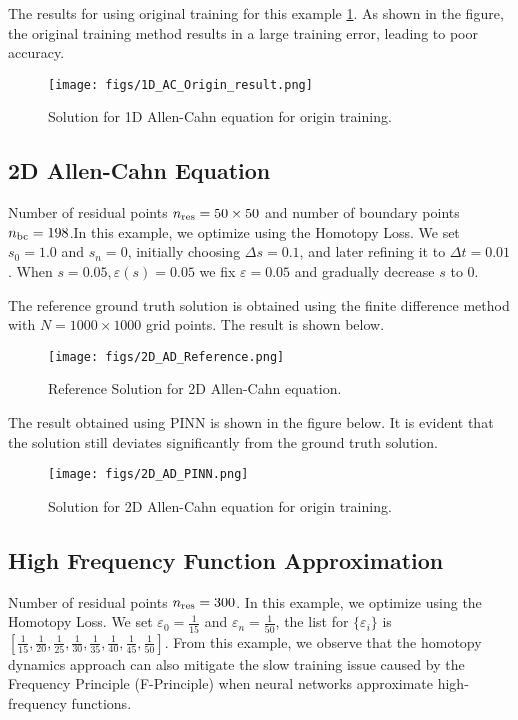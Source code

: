 The results for using original training for this example \cref{fig:1d_allen_cahn_origin_result}. As shown in the figure, the original training method results in a large training error, leading to poor accuracy.

\begin{figure}[htp!]
    \centering
    \texttt{[image: figs/1D\_AC\_Origin\_result.png]}
    \caption{Solution for 1D Allen-Cahn equation for origin training.}
    \label{fig:1d_allen_cahn_origin_result}
\end{figure}

\subsection{2D Allen-Cahn Equation}

Number of residual points $n_\textup{res} = 50\times50$ and number of boundary points $n_{\textup{bc}}=198$.In this example, we optimize using the Homotopy Loss. We set $s_{0} = 1.0$ and $s_n=0$, initially choosing $\Delta s= 0.1$, and later refining it to $\Delta t= 0.01$.    
When $s=0.05, \varepsilon(s) = 0.05$ we fix $\varepsilon = 0.05$ and gradually decrease $s$ to $0$.

The reference ground truth solution is obtained using the finite difference method with $N = 1000 \times 1000$  grid points. The result is shown below.
\begin{figure}[htp!]
    \centering
    \texttt{[image: figs/2D\_AD\_Reference.png]}
    \caption{Reference Solution for 2D Allen-Cahn equation.}
    \label{fig:2d_allen_cahn_reference}
\end{figure}




The result obtained using PINN is shown in the figure below. It is evident that the solution still deviates significantly from the ground truth solution.
\begin{figure}[htp!]
    \centering
    \texttt{[image: figs/2D\_AD\_PINN.png]}
    \caption{Solution for 2D Allen-Cahn equation for origin training.}
    \label{fig:2d_allen_cahn_origin_result}
\end{figure}
\subsection{High Frequency Function Approximation}

Number of residual points $n_\textup{res} = 300$. In this example, we optimize using the Homotopy Loss. We set $\varepsilon_{0} = \frac{1}{15}$ and $\varepsilon_n=\frac{1}{50}$, the list for $\{\varepsilon_i\}$ is $[\frac{1}{15},\frac{1}{20},\frac{1}{25},\frac{1}{30},\frac{1}{35},\frac{1}{40},\frac{1}{45},\frac{1}{50}]$. From this example, we observe that the homotopy dynamics approach can also mitigate the slow training issue caused by the Frequency Principle (F-Principle) when neural networks approximate high-frequency functions.

